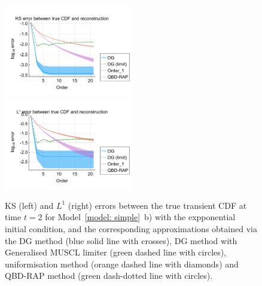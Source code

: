 \begin{figure}
	\centering
	\includegraphics[width=0.5\textwidth,trim={0.75cm 0.8cm 0.25cm 1.25cm},clip]{chapter6/figs/hitting_times_model/reflecting_model/transient_distribution/exp/ks_error_formatted.pdf}%
	\includegraphics[width=0.5\textwidth,trim={0.75cm 0.8cm 0.25cm 1.25cm},clip]{chapter6/figs/hitting_times_model/reflecting_model/transient_distribution/exp/l1_cdf_error_formatted.pdf}
	\caption{KS (left) and \(L^1\) (right) errors between the true transient CDF at time \(t=2\) for Model~\ref{model: simple}~b) with the expponential initial condition, and the corresponding approximations obtained via the DG method (blue solid line with crosses), DG method with Generalised MUSCL limiter (green dashed line with circles), uniformisation method (orange dashed line with diamonds) and QBD-RAP method (green dash-dotted line with circles).} 
	\label{fig: reflecting transient exp} 
\end{figure}













